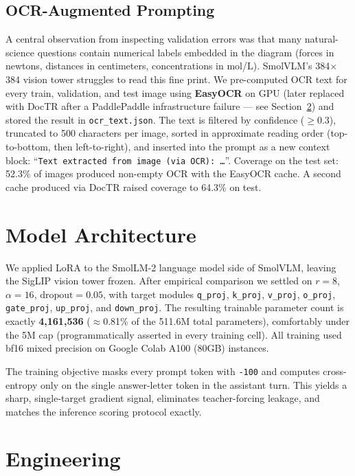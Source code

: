 \documentclass[11pt]{article}
\begin{document}
\subsection{OCR-Augmented Prompting}
A central observation from inspecting validation errors was that many natural-science questions contain numerical labels embedded in the diagram (forces in newtons, distances in centimeters, concentrations in mol/L). SmolVLM's 384$\times$384 vision tower struggles to read this fine print. We pre-computed OCR text for every train, validation, and test image using \textbf{EasyOCR} on GPU (later replaced with DocTR after a PaddlePaddle infrastructure failure --- see Section~\ref{sec:engineering}) and stored the result in \texttt{ocr\_text.json}. The text is filtered by confidence ($\geq 0.3$), truncated to 500 characters per image, sorted in approximate reading order (top-to-bottom, then left-to-right), and inserted into the prompt as a new context block: ``\texttt{Text extracted from image (via OCR): \dots}''. Coverage on the test set: 52.3\% of images produced non-empty OCR with the EasyOCR cache. A second cache produced via DocTR raised coverage to 64.3\% on test.

\section{Model Architecture}

We applied LoRA \cite{hu2022lora} to the SmolLM-2 language model side of SmolVLM, leaving the SigLIP vision tower frozen. After empirical comparison we settled on $r=8$, $\alpha=16$, $\text{dropout}=0.05$, with target modules \texttt{q\_proj}, \texttt{k\_proj}, \texttt{v\_proj}, \texttt{o\_proj}, \texttt{gate\_proj}, \texttt{up\_proj}, and \texttt{down\_proj}. The resulting trainable parameter count is exactly \textbf{4{,}161{,}536} ($\approx$0.81\% of the 511.6M total parameters), comfortably under the 5M cap (programmatically asserted in every training cell). All training used bf16 mixed precision on Google Colab A100 (80GB) instances.

The training objective masks every prompt token with \texttt{-100} and computes cross-entropy only on the single answer-letter token in the assistant turn. This yields a sharp, single-target gradient signal, eliminates teacher-forcing leakage, and matches the inference scoring protocol exactly.

\section{Engineering}
\label{sec:engineering}
\end{document}
